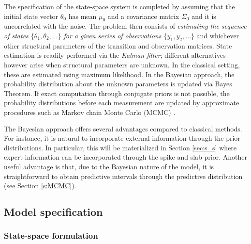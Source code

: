 


The specification of the state-space system is completed by assuming that the initial state vector $\theta_0$ has mean $\mu_0$ and a covariance matrix $\Sigma_0$ and it is uncorrelated with the noise. The problem then consists of \emph{estimating the sequence of states $\{\theta_1, \theta_2, \ldots\}$ for a given series of observations $\{y_1, y_2, \ldots\}$} and whichever other structural parameters of the transition and observation matrices. State estimation is readily performed via the \emph{Kalman filter};  different alternatives however arise  when structural parameters are unknown. In the classical setting, these are estimated using maximum likelihood. In the Bayesian approach, the probability distribution about the unknown parameters is updated via Bayes Theorem. If exact computation through conjugate priors is not possible, the probability distributions before each measurement are updated by approximate procedures such as Markov chain Monte Carlo (MCMC) \cite{scott2014predicting}. 

The Bayesian approach offers several advantages compared to classical methods. For instance, it is natural to incorporate external information through the prior distributions. In particular, this will be materialized in Section \ref{sec:s_s} where expert information can be incorporated through the spike and slab prior. Another useful advantage is that, due to the Bayesian nature of the model, it is straightforward to obtain predictive intervals through the predictive distribution (see Section \ref{s:MCMC}).


\subsection{Model specification}\label{sec:model}



\subsubsection{State-space formulation}


